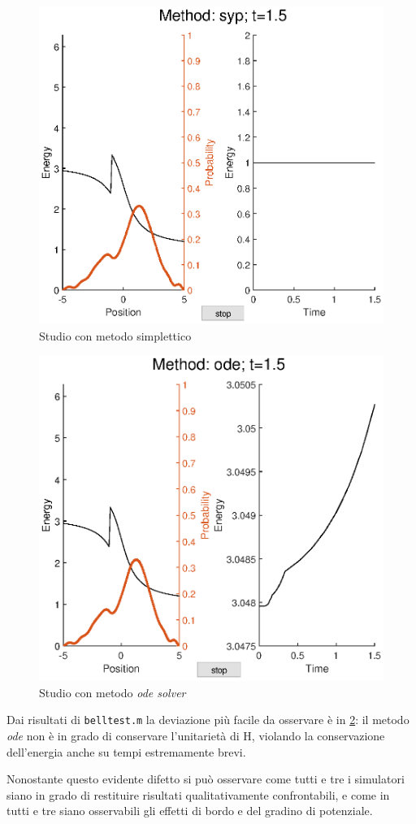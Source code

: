 \documentclass[a4paper,11pt,twoside,twocolumn]{article}
\begin{document}
\begin{figure}
    \centering
    \includegraphics[width=1.0\columnwidth]{hsyp}
    \caption{Studio con metodo simplettico}
    \label{hsyp}
\end{figure}
\begin{figure}
    \centering
    \includegraphics[width=1.0\columnwidth]{hode}
    \caption{Studio con metodo \textit{ode solver}}
    \label{hode}
\end{figure}

Dai risultati di \verb|belltest.m| la deviazione più facile da osservare è in \ref{hode}: il metodo \textit{ode} non è in grado di conservare l'unitarietà di H, violando la conservazione dell'energia anche su tempi estremamente brevi.

Nonostante questo evidente difetto si può osservare come tutti e tre i simulatori siano in grado di restituire risultati qualitativamente confrontabili, e come in tutti e tre siano osservabili gli effetti di bordo e del gradino di potenziale.
\end{document}
